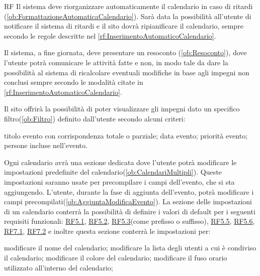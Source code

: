 \begin{listaPersonale}{RF}
	 Il sistema deve riorganizzare automaticamente il calendario in caso di ritardi (\ref{ob:FormattazioneAutomaticaCalendario}). Sarà data la possibilità all'utente di notificare il sistema di ritardi e il sito dovrà ripianificare il calendario, sempre secondo le regole descritte nel \ref{rf:InserimentoAutomaticoCalendario}.

	 Il sistema, a fine giornata, deve presentare un resoconto (\ref{ob:Resoconto}), dove l'utente potrà comunicare le attività fatte e non, in modo tale da dare la possibilità al sistema di ricalcolare eventuali modifiche in base agli impegni non conclusi sempre secondo le modalità citate in \ref{rf:InserimentoAutomaticoCalendario}.

	 Il sito offrirà la possibilità di poter visualizzare gli impegni dato un specifico filtro(\ref{ob:Filtro}) definito dall'utente secondo alcuni criteri:
	\begin{listaPersonale2}{}
		 titolo evento con corrispondenza totale o parziale;
		 data evento;
		 priorità evento;
		 persone incluse nell'evento.
	\end{listaPersonale2}

	 Ogni calendario avrà una sezione dedicata dove l'utente potrà modificare le impostazioni predefinite del calendario(\ref{ob:CalendariMultipli}). Queste impostazioni saranno usate per precompilare i campi dell'evento, che si sta aggiungendo. L'utente, durante la fase di aggiunta dell'evento, potrà modificare i campi precompilati(\ref{ob:AggiuntaModificaEvento}). La sezione delle impostazioni di un calendario conterrà la possibilità di definire i valori di default per i seguenti requisiti funzionali: \hyperref[rf:RestrizioniEvento]{RF5.1}, \hyperref[rf:PrioritaEvento]{RF5.2}, \hyperref[rf:DescrizioneTitoloEvento]{RF5.3}(come prefisso o suffisso), \hyperref[rf:LuogoEvento]{RF5.5}, \hyperref[rf:CondivisioneEvento]{RF5.6}, \hyperref[rf:ImpostazioneTimerNotifiche]{RF7.1}, \hyperref[rf:TitoloNotifiche]{RF7.2} e inoltre questa sezione conterrà le impostazioni per:
	\begin{listaPersonale2}{}
		 modificare il nome del calendario;
		 modificare la lista degli utenti a cui è condiviso il calendario;
		 modificare il colore del calendario;
		 modificare il fuso orario utilizzato all'interno del calendario;


\end{listaPersonale2}
\end{listaPersonale}
